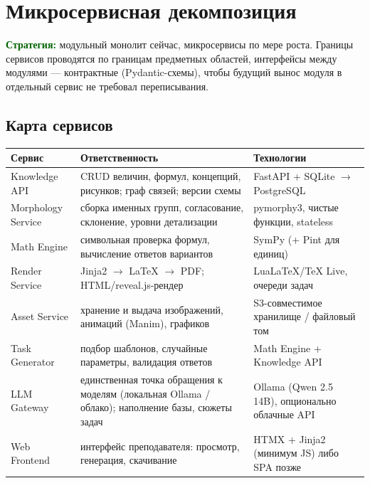 \documentclass[12pt,a4paper]{article}
\newcommand{\idea}[1]{\textcolor{darkgreen}{\textbf{#1}}}
\begin{document}
\section{Микросервисная декомпозиция}

\idea{Стратегия:} модульный монолит сейчас, микросервисы по мере роста. Границы сервисов проводятся по границам предметных областей, интерфейсы между модулями --- контрактные (Pydantic-схемы), чтобы будущий вынос модуля в отдельный сервис не требовал переписывания.

\subsection{Карта сервисов}
\begin{center}
\begin{longtable}{@{}lp{5.4cm}p{5.6cm}@{}}
\toprule
\textbf{Сервис} & \textbf{Ответственность} & \textbf{Технологии} \\
\midrule
\endhead
Knowledge API & CRUD величин, формул, концепций, рисунков; граф связей; версии схемы & FastAPI + SQLite $\to$ PostgreSQL \\
Morphology Service & сборка именных групп, согласование, склонение, уровни детализации & pymorphy3, чистые функции, stateless \\
Math Engine & символьная проверка формул, вычисление ответов вариантов & SymPy (+ Pint для единиц) \\
Render Service & Jinja2 $\to$ LaTeX $\to$ PDF; HTML/reveal.js-рендер & LuaLaTeX/TeX Live, очереди задач \\
Asset Service & хранение и выдача изображений, анимаций (Manim), графиков & S3-совместимое хранилище / файловый том \\
Task Generator & подбор шаблонов, случайные параметры, валидация ответов & Math Engine + Knowledge API \\
LLM Gateway & единственная точка обращения к моделям (локальная Ollama / облако); наполнение базы, сюжеты задач & Ollama (Qwen 2.5 14B), опционально облачные API \\
Web Frontend & интерфейс преподавателя: просмотр, генерация, скачивание & HTMX + Jinja2 (минимум JS) либо SPA позже \\
\bottomrule
\end{longtable}
\end{center}
\end{document}
